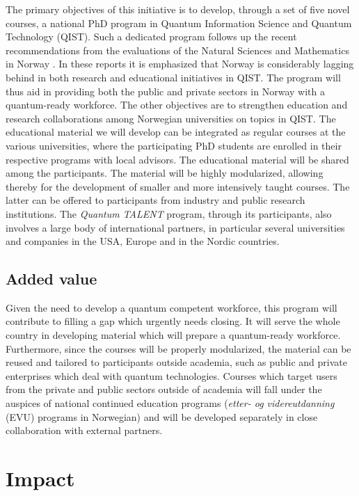 \documentclass{scrreprt}
\begin{document}
The primary objectives of this initiative is to develop, through a set of five novel courses, a national PhD program in Quantum Information Science and Quantum Technology (QIST). Such a dedicated program follows up the recent recommendations from the evaluations of the Natural Sciences and Mathematics in Norway \cite{evalnat,evalmat}. In these reports it is emphasized that Norway is considerably lagging behind in both research and educational initiatives in QIST. 
The program will thus aid in providing both the public and private sectors in Norway with a quantum-ready workforce.  The other objectives are to strengthen education and research collaborations among Norwegian universities on topics in QIST. 
The educational material we will develop can be integrated as regular courses at the various universities, where the participating PhD students are enrolled in their respective programs with local advisors. The educational material will be shared among the participants. The material will be highly modularized, allowing thereby for the development of smaller and more intensively taught courses. The   latter can be offered to participants from industry and public research institutions. 
The \textit{Quantum TALENT} program, through its participants, also involves a large body of international partners, in particular several universities and companies in the USA, Europe  and in the Nordic countries.

\subsection{Added value}


Given the need to develop a quantum competent workforce, this program will contribute to filling a gap which urgently needs closing.   It will  serve the whole country in developing material which will prepare a
quantum-ready workforce. Furthermore, since the courses will be
properly modularized, the material can be reused and tailored to
participants outside academia, such as public and private enterprises
which deal with quantum technologies. Courses which target users from
the private and public sectors outside of academia will fall under the
auspices of national continued education programs (\textit{etter- og videreutdanning} (EVU)
programs in Norwegian) and will be developed separately in close
collaboration with external partners.

\section{Impact}
\end{document}
